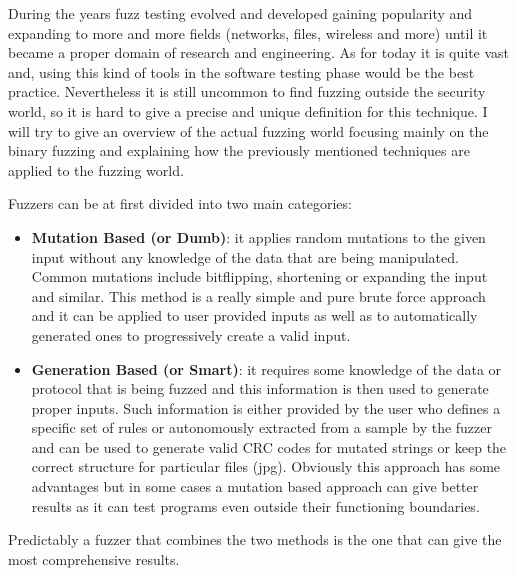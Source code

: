 \documentclass[../main.tex]{subfiles}
\begin{document}
During the years fuzz testing evolved and developed gaining popularity and
expanding to more and more fields (networks, files, wireless and more) until it
became a proper domain of research and engineering. As for today it is
quite vast and, using this kind of tools in the software testing phase would be the best practice. Nevertheless it is still uncommon to find fuzzing
outside the security world, so it is hard to give a precise and unique
definition for this technique. I will try to give an overview of the actual fuzzing world focusing mainly on the binary fuzzing and explaining how the previously mentioned techniques are applied to the fuzzing world.

Fuzzers can be at first divided into two main categories:

\begin{itemize}
  \item{\textbf{Mutation Based (or Dumb)}: it applies random mutations to the
  given  input without any knowledge of the data that are being manipulated.
  Common  mutations include bitflipping, shortening or expanding the input and
  similar.  This  method is a really simple and pure brute force approach and it
  can be  applied  to user provided inputs as well as to automatically generated
  ones to  progressively create a valid input.}

  \item{\textbf{Generation Based (or Smart)}: it requires some knowledge of the
  data or protocol that is being fuzzed and this information is then used to
  generate proper inputs. Such information is either provided by the user
  who defines a specific set of rules or autonomously extracted from a sample
  by the  fuzzer and can be used to generate valid CRC codes for mutated  strings  or  keep the correct  structure for particular files (jpg). Obviously this approach has some  advantages but in some cases a mutation based approach can  give better results  as it can test programs even outside their functioning  boundaries.}

\end{itemize}

Predictably a fuzzer that combines the two methods is the one that can give the most comprehensive results.
\end{document}
